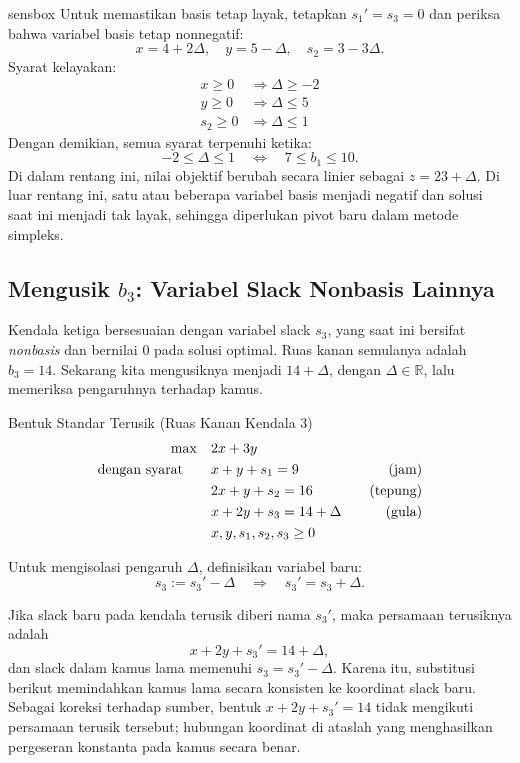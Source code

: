 \begin{steppanel}{sensbox}
Untuk memastikan basis tetap layak, tetapkan \( s_1' = s_3 = 0 \) dan periksa bahwa variabel basis tetap nonnegatif:
\[
x = 4 + 2\Delta, \quad
y = 5 - \Delta, \quad
s_2 = 3 - 3\Delta.
\]
Syarat kelayakan:
\[
\begin{aligned}
x \geq 0 &\Rightarrow \Delta \geq -2 \\
y \geq 0 &\Rightarrow \Delta \leq 5 \\
s_2 \geq 0 &\Rightarrow \Delta \leq 1
\end{aligned}
\]
Dengan demikian, semua syarat terpenuhi ketika:
\[
\boxed{-2 \leq \Delta \leq 1}
\quad\Longleftrightarrow\quad
7 \leq b_1 \leq 10.
\]
Di dalam rentang ini, nilai objektif berubah secara linier sebagai \( z = 23 + \Delta \). Di luar rentang ini, satu atau beberapa variabel basis menjadi negatif dan solusi saat ini menjadi tak layak, sehingga diperlukan pivot baru dalam metode simpleks.
\end{steppanel}

\subsection{Mengusik \( b_3 \): Variabel Slack Nonbasis Lainnya}

Kendala ketiga bersesuaian dengan variabel slack \( s_3 \), yang saat ini bersifat \emph{nonbasis} dan bernilai 0 pada solusi optimal. Ruas kanan semulanya adalah \( b_3 = 14 \). Sekarang kita mengusiknya menjadi \( 14 + \Delta \), dengan \( \Delta \in \mathbb{R} \), lalu memeriksa pengaruhnya terhadap kamus.

\begin{sensdisplay}{Bentuk Standar Terusik (Ruas Kanan Kendala 3)}
\[
\begin{aligned}
\max \quad & 2x + 3y \\
\mbox{dengan syarat}\quad \quad
& x + y + s_1 = 9 \quad & \mbox{(jam)} \\
& 2x + y + s_2 = 16 \quad & \mbox{(tepung)} \\
& x + 2y + s_3 = 14 + \Delta \quad & \mbox{(gula)} \\
& x, y, s_1, s_2, s_3 \geq 0
\end{aligned}
\]

Untuk mengisolasi pengaruh \( \Delta \), definisikan variabel baru:
\[
s_3 := s_3' - \Delta \quad \Rightarrow \quad s_3' = s_3 + \Delta.
\]

Jika slack baru pada kendala terusik diberi nama \(s_3'\), maka persamaan terusiknya adalah
\[
x + 2y + s_3' = 14 + \Delta,
\]
dan slack dalam kamus lama memenuhi \(s_3=s_3'-\Delta\). Karena itu, substitusi berikut memindahkan kamus lama secara konsisten ke koordinat slack baru.
Sebagai koreksi terhadap sumber, bentuk \(x+2y+s_3'=14\) tidak mengikuti persamaan terusik tersebut; hubungan koordinat di ataslah yang menghasilkan pergeseran konstanta pada kamus secara benar.
\end{sensdisplay}

